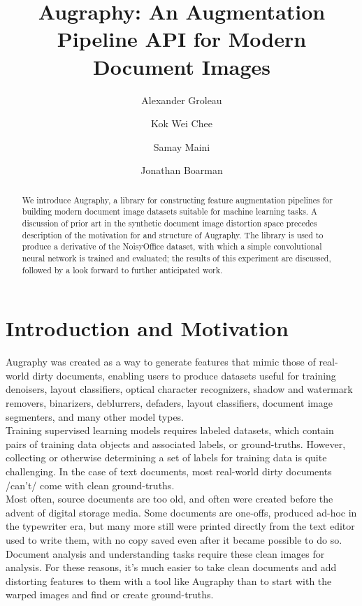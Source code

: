 \documentclass[runningheads]{llncs}
\begin{document}
\title{Augraphy: An Augmentation Pipeline API for Modern Document Images}
\author{Alexander Groleau \and
Kok Wei Chee \and
Samay Maini \and
Jonathan Boarman}



\maketitle

\begin{abstract}
We introduce Augraphy, a library for constructing feature augmentation pipelines for building modern document image datasets suitable for machine learning tasks. A discussion of prior art in the synthetic document image distortion space precedes description of the motivation for and structure of Augraphy. The library is used to produce a derivative of the NoisyOffice dataset, with which a simple convolutional neural network is trained and evaluated; the results of this experiment are discussed, followed by a look forward to further anticipated work.
\end{abstract}

\section{Introduction and Motivation}
Augraphy was created as a way to generate features that mimic those of real-world dirty documents, enabling users to produce datasets useful for training denoisers, layout classifiers, optical character recognizers, shadow and watermark removers, binarizers, deblurrers, defaders, layout classifiers, document image segmenters, and many other model types.\\

Training supervised learning models requires labeled datasets, which contain pairs of training data objects and associated labels, or ground-truths. However, collecting or otherwise determining a set of labels for training data is quite challenging.  In the case of text documents, most real-world dirty documents /can't/ come with clean ground-truths.\\

Most often, source documents are too old, and often were created before the advent of digital storage media. Some documents are one-offs, produced ad-hoc in the typewriter era, but many more still were printed directly from the text editor used to write them, with no copy saved even after it became possible to do so. Document analysis and understanding tasks require these clean images for analysis. For these reasons, it's much easier to take clean documents and add distorting features to them with a tool like Augraphy than to start with the warped images and find or create ground-truths.
\end{document}
